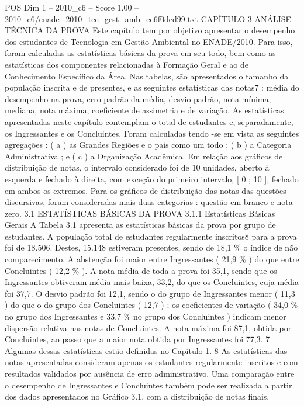 \begin{textsample}{POS Dim 1 – 2010\_c6 – Score 1.00 – 2010\_c6/enade\_2010\_tec\_gest\_amb\_ee6f0ded99.txt}  \label{ex:f1_pos_162}
CAPÍTULO 3 ANÁLISE TÉCNICA DA PROVA Este capítulo tem por objetivo apresentar o desempenho dos estudantes de Tecnologia em Gestão Ambiental no ENADE/2010.
Para isso, foram calculadas as estatísticas básicas da prova em seu todo, bem como as estatísticas dos componentes relacionadas à Formação Geral e ao de Conhecimento Específico da Área.
Nas tabelas, são apresentados o tamanho da população inscrita e de presentes, e as seguintes estatísticas das notas7 : média do desempenho na prova, erro padrão da média, desvio padrão, nota mínima, mediana, nota máxima, coeficiente de assimetria e de variação.
As estatísticas apresentadas neste capítulo contemplam o total de estudantes e, separadamente, os Ingressantes e os Concluintes.
Foram calculadas tendo -se em vista as seguintes agregações : ( a ) as Grandes Regiões e o país como um todo ; ( b ) a Categoria Administrativa ; e ( c ) a Organização Acadêmica.
Em relação aos gráficos de distribuição de notas, o intervalo considerado foi de 10 unidades, aberto à esquerda e fechado à direita, com exceção do primeiro intervalo, [ 0 ; 10 ], fechado em ambos os extremos.
Para os gráficos de distribuição das notas das questões discursivas, foram consideradas mais duas categorias : questão em branco e nota zero. 3.1 ESTATÍSTICAS BÁSICAS DA PROVA 3.1.1 Estatísticas Básicas Gerais A Tabela 3.1 apresenta as estatísticas básicas da prova por grupo de estudantes.
A população total de estudantes regularmente inscritos8 para a prova foi de 18.506.
Destes, 15.148 estiveram presentes, sendo de 18,1 \% o índice de não comparecimento.
A abstenção foi maior entre Ingressantes ( 21,9 \% ) do que entre Concluintes ( 12,2 \% ).
A nota média de toda a prova foi 35,1, sendo que os Ingressantes obtiveram média mais baixa, 33,2, do que os Concluintes, cuja média foi 37,7.
O desvio padrão foi 12,1, sendo o do grupo de Ingressantes menor ( 11,3 ) do que o do grupo dos Concluintes ( 12,7 ) ; os coeficientes de variação ( 34,0 \% no grupo dos Ingressantes e 33,7 \% no grupo dos Concluintes ) indicam menor dispersão relativa nas notas de Concluintes.
A nota máxima foi 87,1, obtida por Concluintes, ao passo que a maior nota obtida por Ingressantes foi 77,3. 7 Algumas dessas estatísticas estão definidas no Capítulo 1. 8 As estatísticas das notas apresentadas consideram apenas os estudantes regularmente inscritos e com resultados validados por ausência de erro administrativo.
Uma comparação entre o desempenho de Ingressantes e Concluintes também pode ser realizada a partir dos dados apresentados no Gráfico 3.1, com a distribuição de notas finais.

\end{textsample}
